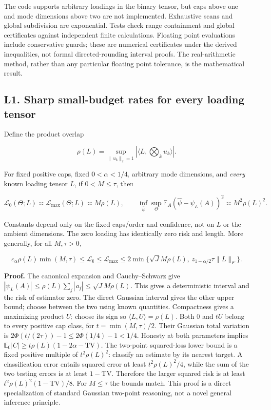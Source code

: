 The code supports arbitrary loadings in the binary tensor, but caps
above one and mode dimensions above two are not implemented. Exhaustive
scans and global subdivision are exponential. Tests check range
containment and global certificates against independent finite
calculations. Floating point evaluations include conservative guards;
these are numerical certificates under the derived inequalities, not
formal directed-rounding interval proofs. The real-arithmetic method,
rather than any particular floating point tolerance, is the mathematical
result.

\subsection{L1. Sharp small-budget rates for every loading
tensor}\label{l1.-sharp-small-budget-rates-for-every-loading-tensor}\label{sup:L1}

Define the product overlap

\[\rho(L)=\sup_{\|u_k\|_2=1}|\langle L,\bigotimes_k u_k\rangle|.\]

For fixed positive caps, fixed \(0<\alpha<1/4\), arbitrary mode
dimensions, and \emph{every} known loading tensor \(L\), if
\(0<M\le\tau\), then

\[\mathcal L_0(\Theta;L)\asymp\mathcal L_{\max}(\Theta;L)
\asymp M\rho(L),\qquad
\inf_{\widehat\psi}\sup_\Theta\mathbb E_A
(\widehat\psi-\psi_L(A))^2\asymp M^2\rho(L)^2.\]

Constants depend only on the fixed caps/order and confidence, not on
\(L\) or the ambient dimensions. The zero loading has identically zero
risk and length. More generally, for all \(M,\tau>0\),

\[c_\alpha\rho(L)\min(M,\tau)
\le \mathcal L_0\le\mathcal L_{\max}
\le 2\min\{\sqrt J M\rho(L),\ z_{1-\alpha/2}\tau\|L\|_F\}.\]

\textbf{Proof.} The canonical expansion and Cauchy--Schwarz give
\(|\psi_L(A)|\le\rho(L)\sum_j|a_j|\le\sqrt J M\rho(L)\). This gives a
deterministic interval and the risk of estimator zero. The direct
Gaussian interval gives the other upper bound; choose between the two
using known quantities. Compactness gives a maximizing product \(U\);
choose its sign so \(\langle L,U\rangle=\rho(L)\). Both \(0\) and \(tU\)
belong to every positive cap class, for \(t=\min(M,\tau)/2\). Their
Gaussian total variation is \(2\Phi(t/(2\tau))-1\le2\Phi(1/4)-1<1/4\).
Honesty at both parameters implies
\(\mathbb E_0|C|\ge t\rho(L)(1-2\alpha-\mathrm{TV})\). The two-point
squared-loss lower bound is a fixed positive multiple of
\(t^2\rho(L)^2\): classify an estimate by its nearest target. A
classification error entails squared error at least \(t^2\rho(L)^2/4\),
while the sum of the two testing errors is at least \(1-\mathrm{TV}\).
Therefore the larger squared risk is at least
\(t^2\rho(L)^2(1-\mathrm{TV})/8\). For \(M\le\tau\) the bounds match.
This proof is a direct specialization of standard Gaussian two-point
reasoning, not a novel general inference principle.

